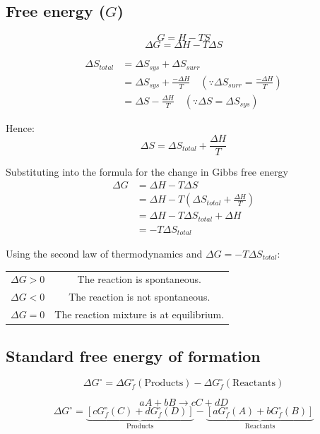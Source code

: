 \documentclass[11pt]{article}
\begin{document}
\newpage

\subsection{Free energy (\(G\))}
\label{sec:org12f9020}
\[G = H - TS\]
\[\Delta G = \Delta H - T \Delta S\]

\begin{align*}
\Delta S_{total} &= \Delta S_{sys} + \Delta S_{surr} \\
&= \Delta S_{sys} + \frac{- \Delta H}{T} \quad (\because \Delta S_{surr} = \frac{-\Delta H}{T}) \\
&= \Delta S - \frac{\Delta H}{T} \quad (\because \Delta S = \Delta S_{sys})
\end{align*}

Hence:
\[\Delta S = \Delta S_{total} + \frac{\Delta H}{T}\]

Substituting into the formula for the change in Gibbs free energy
\begin{align*}
\Delta G &= \Delta H - T \Delta S \\
&= \Delta H - T \left( \Delta S_{total} + \frac{\Delta H}{T} \right) \\
&= \Delta H - T \Delta S_{total} + \Delta H \\
&= - T \Delta S_{total}
\end{align*}

Using the second law of thermodynamics and \(\Delta G = - T \Delta S_{total}\):
\begin{center}
\begin{tabular}{c c}
\(\Delta G > 0\) & The reaction is spontaneous. \\
\(\Delta G < 0\) & The reaction is not spontaneous. \\
\(\Delta G = 0\) & The reaction mixture is at equilibrium.
\end{tabular}
\end{center}

\subsection{Standard free energy of formation}
\label{sec:orgce913e0}
\[\Delta G^{\circ} = \Delta G^{\circ}_f (\text{Products}) - \Delta G^{\circ}_f (\text{Reactants})\]

\[aA + bB \rightarrow cC + dD\]
\[\Delta G^{\circ} = \underbrace{[cG^{\circ}_f(C) + dG^{\circ}_f(D)]}_{\text{Products}} - \underbrace{[aG^{\circ}_f(A) + bG^{\circ}_f(B)]}_{\text{Reactants}}\]
\end{document}
